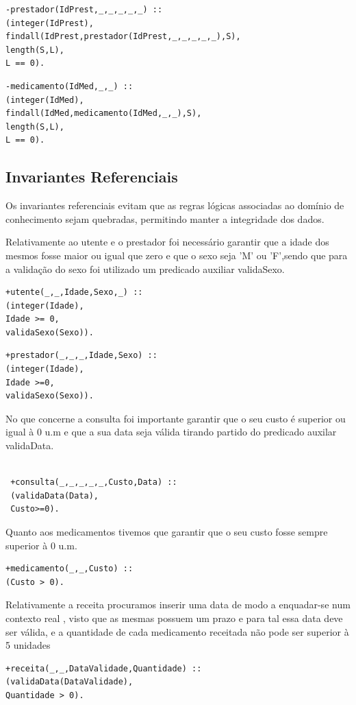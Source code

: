 \documentclass[25pt]{article}
\begin{document}
\begin{lstlisting}
-prestador(IdPrest,_,_,_,_,_) ::
(integer(IdPrest),
findall(IdPrest,prestador(IdPrest,_,_,_,_,_),S),
length(S,L),
L == 0).
\end{lstlisting}

\begin{lstlisting}
-medicamento(IdMed,_,_) ::
(integer(IdMed),
findall(IdMed,medicamento(IdMed,_,_),S),
length(S,L),
L == 0).
\end{lstlisting}




\subsection{Invariantes Referenciais}
Os invariantes referenciais evitam que as regras lógicas associadas ao domínio
de conhecimento sejam quebradas, permitindo manter a integridade dos dados.\newpage

Relativamente ao utente e o prestador foi necessário garantir que a idade dos mesmos fosse maior ou igual que zero e que o sexo  seja  'M' ou 'F',sendo que para a  validação do sexo foi utilizado um predicado auxiliar validaSexo.\\

\begin{lstlisting}
+utente(_,_,Idade,Sexo,_) ::
(integer(Idade),
Idade >= 0,
validaSexo(Sexo)).
\end{lstlisting}


\begin{lstlisting}
+prestador(_,_,_,Idade,Sexo) ::
(integer(Idade),
Idade >=0,
validaSexo(Sexo)).
\end{lstlisting}


No que concerne a consulta foi importante garantir  que o seu custo é superior ou igual à 0 u.m e que a sua data seja válida tirando partido do predicado auxilar validaData.
\begin{lstlisting}

 +consulta(_,_,_,_,_,Custo,Data) ::
 (validaData(Data),
 Custo>=0).
\end{lstlisting}



Quanto aos medicamentos tivemos que garantir que o seu custo fosse sempre superior à 0 u.m.
\begin{lstlisting}
+medicamento(_,_,Custo) ::
(Custo > 0).
\end{lstlisting}


Relativamente a receita procuramos inserir uma data de modo a enquadar-se num contexto real , visto que as mesmas possuem um prazo e para tal
essa data deve ser válida, e a quantidade de cada medicamento receitada não pode ser superior à 5 unidades
\begin{lstlisting}
+receita(_,_,DataValidade,Quantidade) ::
(validaData(DataValidade),
Quantidade > 0).
\end{lstlisting}
\end{document}
